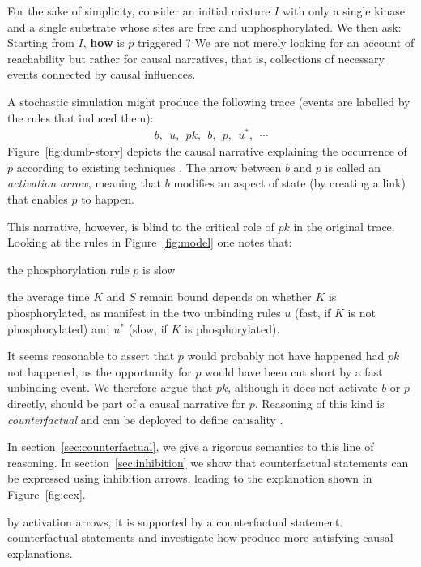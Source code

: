 

For the sake of simplicity, consider an initial mixture $I$ with only
a single kinase and a single substrate whose sites are free and
unphosphorylated. We then ask: Starting from $I$, \textbf{how} is $p$
triggered ? We are not merely looking for an account of reachability
but rather for causal narratives, that is, collections of necessary
events connected by causal influences.

A stochastic simulation \cite{DanosEtAl-APLAS07} might produce the
following trace (events are labelled by the rules that induced them):
\begin{align}\label{example-trace} b,\ \ u,\ \ pk,\ \ b,\ \ p,\ \
  u^{*},\ \ \cdots
\end{align} Figure~\ref{fig:dumb-story} depicts the causal narrative
explaining the occurrence of $p$ according to existing techniques
\cite{DBLP:conf/fsttcs/DanosFFHH12,DanosEtAl-CONCUR07}. The arrow
between $b$ and $p$ is called an \textit{activation arrow}, meaning
that $b$ modifies an aspect of state (by creating a link) that enables
$p$ to happen.


This narrative, however, is blind to the critical role of $pk$ in the
original trace. Looking at the rules in Figure~\ref{fig:model} one
notes that:
\begin{inparaenum}[(i)]
\item the phosphorylation rule $p$ is slow
\item the average time $K$ and $S$ remain bound depends on whether $K$
  is phosphorylated, as manifest in the two unbinding rules $u$ (fast,
  if $K$ is not phosphorylated) and $u^{*}$ (slow, if $K$ is
  phosphorylated).
\end{inparaenum} It seems reasonable to assert that $p$ would probably
not have happened had $pk$ not happened, as the opportunity for $p$
would have been cut short by a fast unbinding event. We therefore
argue that $pk$, although it does not activate $b$ or $p$ directly,
should be part of a causal narrative for $p$. Reasoning of this kind
is \textit{counterfactual} and can be deployed to define causality
\cite{lewis1974causation,lewis2000causation}.

In section~\ref{sec:counterfactual}, we give a rigorous semantics to
this line of reasoning. In section~\ref{sec:inhibition} we show that
counterfactual statements can be expressed using inhibition arrows,
leading to the explanation shown in Figure~\ref{fig:cex}.

by activation arrows, it is supported by a counterfactual statement.
counterfactual statements and investigate how %
produce more satisfying causal explanations.
